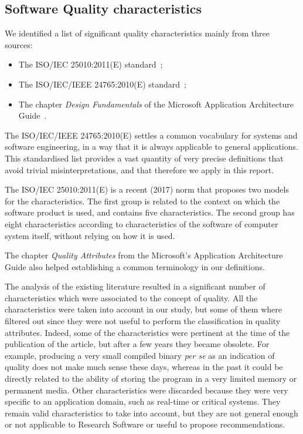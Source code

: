 \subsection{Software Quality characteristics}
\label{subsect:sqchar}

We identified a list of significant quality characteristics mainly from three sources:

\begin{itemize}
    \item The ISO/IEC 25010:2011(E) standard~\cite{iso_25010_2011_2017};
    \item The ISO/IEC/IEEE 24765:2010(E) standard~\cite{iso_central_secretary_isoiecieee_2010};
    \item The chapter \textit{Design Fundamentals} of the Microsoft Application Architecture Guide~\cite{microsoft_2010}.
\end{itemize}

The ISO/IEC/IEEE 24765:2010(E) settles a common vocabulary for systems and software engineering, in a way that it is always applicable to general applications. This standardised list provides a vast quantity of very precise definitions that avoid trivial misinterpretations, and that therefore we apply in this report.


The ISO/IEC 25010:2011(E) is a recent (2017) norm that proposes two models for the characteristics. The first group is related to the context on which the software product is used, and contains five characteristics. The second group has eight characteristics according to characteristics of the software of computer system itself, without relying on how it is used.

The chapter \textit{Quality Attributes} from the Microsoft's Application Architecture Guide also helped establishing a common terminology in our definitions.

The analysis of the existing literature resulted in a significant number of characteristics which were associated to the concept of quality. All the characteristics were taken into account in our study, but some of them where filtered out since they were not useful to perform the classification in quality attributes. Indeed, some of the characteristics were pertinent at the time of the publication of the article, but after a few years they became obsolete. For example, producing a very small compiled binary \textit{per se} as an indication of quality does not make much sense these days, whereas in the past it could be directly related to the ability of storing the program in a very limited memory or permanent media. Other characteristics were discarded because they were very specific to an application domain, such as real-time or critical systems. They remain valid characteristics to take into account, but they are not general enough or not applicable to Research Software or useful to propose recommendations.

